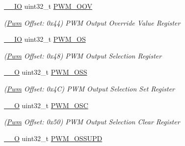 \begin{DoxyCompactItemize}
\mbox{\label{structPwm_ab49467577b36a316a1785624f658b983}} 
\mbox{\hyperlink{core__cm7_8h_aec43007d9998a0a0e01faede4133d6be}{\+\_\+\+\_\+\+IO}} uint32\+\_\+t \mbox{\hyperlink{structPwm_ab49467577b36a316a1785624f658b983}{P\+W\+M\+\_\+\+O\+OV}}
\begin{DoxyCompactList}\small\item\em (\mbox{\hyperlink{structPwm}{Pwm}} Offset\+: 0x44) P\+WM Output Override Value Register \end{DoxyCompactList}\item 
\mbox{\label{structPwm_ae849226c0b45aa1e7a4b6353970f7cc0}} 
\mbox{\hyperlink{core__cm7_8h_aec43007d9998a0a0e01faede4133d6be}{\+\_\+\+\_\+\+IO}} uint32\+\_\+t \mbox{\hyperlink{structPwm_ae849226c0b45aa1e7a4b6353970f7cc0}{P\+W\+M\+\_\+\+OS}}
\begin{DoxyCompactList}\small\item\em (\mbox{\hyperlink{structPwm}{Pwm}} Offset\+: 0x48) P\+WM Output Selection Register \end{DoxyCompactList}\item 
\mbox{\label{structPwm_aaaeaaa05fb609641fb915fadcc3dc440}} 
\mbox{\hyperlink{core__cm7_8h_a7e25d9380f9ef903923964322e71f2f6}{\+\_\+\+\_\+O}} uint32\+\_\+t \mbox{\hyperlink{structPwm_aaaeaaa05fb609641fb915fadcc3dc440}{P\+W\+M\+\_\+\+O\+SS}}
\begin{DoxyCompactList}\small\item\em (\mbox{\hyperlink{structPwm}{Pwm}} Offset\+: 0x4C) P\+WM Output Selection Set Register \end{DoxyCompactList}\item 
\mbox{\label{structPwm_afe7ebaa1b564156e7c974cc8743bf6b0}} 
\mbox{\hyperlink{core__cm7_8h_a7e25d9380f9ef903923964322e71f2f6}{\+\_\+\+\_\+O}} uint32\+\_\+t \mbox{\hyperlink{structPwm_afe7ebaa1b564156e7c974cc8743bf6b0}{P\+W\+M\+\_\+\+O\+SC}}
\begin{DoxyCompactList}\small\item\em (\mbox{\hyperlink{structPwm}{Pwm}} Offset\+: 0x50) P\+WM Output Selection Clear Register \end{DoxyCompactList}\item 
\mbox{\label{structPwm_a7aa925947ae2f13035028966882c7887}} 
\mbox{\hyperlink{core__cm7_8h_a7e25d9380f9ef903923964322e71f2f6}{\+\_\+\+\_\+O}} uint32\+\_\+t \mbox{\hyperlink{structPwm_a7aa925947ae2f13035028966882c7887}{P\+W\+M\+\_\+\+O\+S\+S\+U\+PD}}

\end{DoxyCompactItemize}
